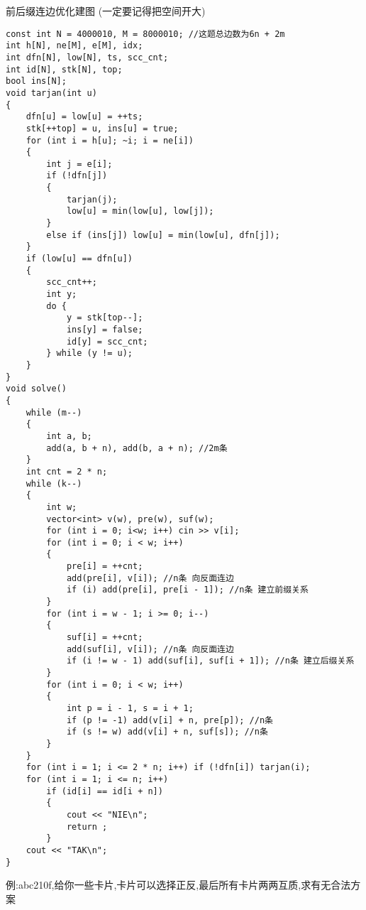 \documentclass[a4paper, fontset=none]{ctexart}
\begin{document}
前后缀连边优化建图 (一定要记得把空间开大)
\begin{verbatim}
const int N = 4000010, M = 8000010; //这题总边数为6n + 2m
int h[N], ne[M], e[M], idx;
int dfn[N], low[N], ts, scc_cnt;
int id[N], stk[N], top;
bool ins[N];
void tarjan(int u)
{
    dfn[u] = low[u] = ++ts;
    stk[++top] = u, ins[u] = true;
    for (int i = h[u]; ~i; i = ne[i])
    {
        int j = e[i];
        if (!dfn[j])
        {
            tarjan(j);
            low[u] = min(low[u], low[j]);
        }
        else if (ins[j]) low[u] = min(low[u], dfn[j]);
    }
    if (low[u] == dfn[u])
    {
        scc_cnt++;
        int y;
        do {
            y = stk[top--];
            ins[y] = false;
            id[y] = scc_cnt;
        } while (y != u);
    }
}
void solve()
{
    while (m--)
    {
        int a, b;
        add(a, b + n), add(b, a + n); //2m条
    }
    int cnt = 2 * n;
    while (k--)
    {
        int w;
        vector<int> v(w), pre(w), suf(w);
        for (int i = 0; i<w; i++) cin >> v[i];
        for (int i = 0; i < w; i++)
        {
            pre[i] = ++cnt;
            add(pre[i], v[i]); //n条 向反面连边
            if (i) add(pre[i], pre[i - 1]); //n条 建立前缀关系
        }
        for (int i = w - 1; i >= 0; i--)
        {
            suf[i] = ++cnt;
            add(suf[i], v[i]); //n条 向反面连边
            if (i != w - 1) add(suf[i], suf[i + 1]); //n条 建立后缀关系
        }
        for (int i = 0; i < w; i++)
        {
            int p = i - 1, s = i + 1;
            if (p != -1) add(v[i] + n, pre[p]); //n条
            if (s != w) add(v[i] + n, suf[s]); //n条
        }
    }
    for (int i = 1; i <= 2 * n; i++) if (!dfn[i]) tarjan(i);
    for (int i = 1; i <= n; i++)
        if (id[i] == id[i + n])
        {
            cout << "NIE\n";
            return ;
        }
    cout << "TAK\n";
}
\end{verbatim}

例:abc210f,给你一些卡片,卡片可以选择正反,最后所有卡片两两互质,求有无合法方案
\end{document}
